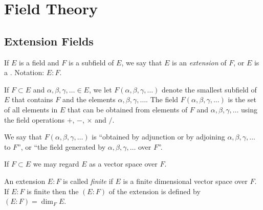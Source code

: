 \section{Field Theory}
\subsection{Extension Fields}
\begin{definition}
	If $E$ is a field and $F$ is a subfield of $E$, we say that $E$ is an \emph{extension} of $F$, or $E$ is a . Notation: $E:F$.
\end{definition}

If $F \subset E$ and $\alpha, \beta, \gamma, \dots \in E$, we let $F(\alpha, \beta, \gamma, \dots)$ denote the smallest subfield of $E$ that contains $F$ and the elements $\alpha, \beta, \gamma, \dots$. The field $F(\alpha, \beta, \gamma, \dots)$ is the set of all elements in $E$ that can be obtained from elements of $F$ and $\alpha, \beta, \gamma, \dots$ using the field operations $+$, $-$, $\times$ and $/$.

We say that $F(\alpha, \beta, \gamma, \dots)$ is ``obtained by adjunction or by adjoining $\alpha, \beta, \gamma, \dots$ to $F$'', or ``the field generated by $\alpha, \beta, \gamma, \dots$ over $F$''.

If $F \subset E$ we may regard $E$ as a vector space over $F$.

\begin{definition}
	An extension $E:F$ is called \emph{finite} if $E$ is a finite dimensional vector space over $F$. If $E:F$ is finite then the  $(E:F)$ of the extension is defined by $(E:F) = \dim_F{E}$.
\end{definition}

